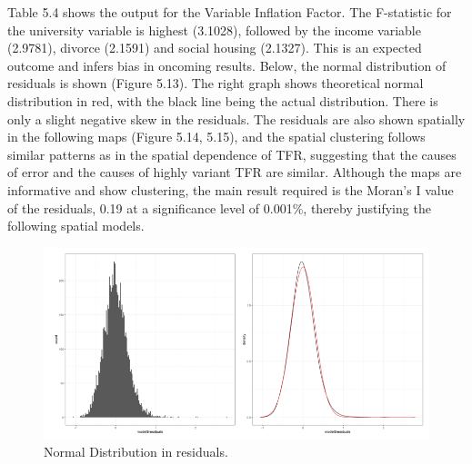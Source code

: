 \documentclass[12pt,twoside]{reedthesis}
\begin{document}
Table 5.4 shows the output for the Variable Inflation Factor. The F-statistic for the university variable is highest (3.1028), followed by the income variable (2.9781), divorce (2.1591) and social housing (2.1327). This is an expected outcome and infers bias in oncoming results. Below, the normal distribution of residuals is shown (Figure 5.13). The right graph shows theoretical normal distribution in red, with the black line being the actual distribution. There is only a slight negative skew in the residuals. The residuals are also shown spatially in the following maps (Figure 5.14, 5.15), and the spatial clustering follows similar patterns as in the spatial dependence of TFR, suggesting that the causes of error and the causes of highly variant TFR are similar. Although the maps are informative and show clustering, the main result required is the Moran's I value of the residuals, 0.19 at a significance level of 0.001\%, thereby justifying the following spatial models.
\begin{figure}
\includegraphics[width=0.95\linewidth]{figure/Figure_14} \caption{Normal Distribution in residuals.}\label{fig:figure14}
\end{figure}
\end{document}
